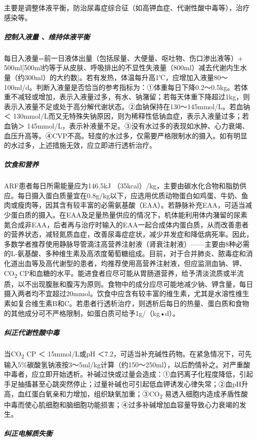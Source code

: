 主要是调整体液平衡，防治尿毒症综合征（如高钾血症、代谢性酸中毒等），治疗感染等。

\subparagraph{控制入液量 、维持体液平衡}

每日入液量=前一日液体出量（包括尿量、大便量、呕吐物、伤口渗出液等）+
500ml{[}500ml约等于从皮肤、呼吸排出的不显性失液量（800ml）减去代谢内生水量（约300ml）的大约数{]}。若有发热，体温每升高1℃，应增加入液量80～100ml/d。判断入液量是否恰当的参考指标为：①体重每日下降0.2～0.5kg。若体重不减轻或增加，表示入液量过多，有水、钠潴留；若每天体重下降超过1kg，则表示入液量不足或处于高分解代谢状态。②血钠保持在130～145mmol/L。若血钠＜
130mmol/L而又无特殊失钠原因，则为稀释性低钠血症，表示入液量过多；若血钠＞
145mmol/L，表示补液量不足。③没有水过多的表现如水肿、心力衰竭、血压升高等。④CVP不高。轻度的水过多，仅需要严格限制水的摄入。如有明显的水过多，上述措施无效，应立即进行透析治疗。

\subparagraph{饮食和营养}

ARF患者每日所需能量应为146.5kJ
（35kcal）/kg，主要由碳水化合物和脂肪供应。每日摄入蛋白质量宜在0.8g/kg以下，应选用优质动物蛋白如鸡蛋、牛奶、鱼肉或瘦肉等，因其含有较丰富的必需氨基酸（EAA）。若静脉补充EAA，可适当减少蛋白质的摄入。在EAA及足量热量供应的情况下，机体能利用体内潴留的尿素氮合成非EAA，后者再与治疗时输入的EAA一起合成体内蛋白质，从而改善患者的营养状态，减轻氮质血症，改善尿毒症症状，减少并发症和降低病死率。因此，多数学者推荐使用静脉导管滴注高营养注射液（肾衰注射液）------主要由8种必需的L-氨基酸、多种维生素及高浓度葡萄糖组成。目前，对于合并肺炎、脓毒症和消化道出血等及高代谢型的患者，均推荐使用高营养注射液，但应监测血钠、钾、CO\textsubscript{2}
CP和血糖的水平。能进食者应尽可能从胃肠道营养，给予清淡流质或半流质，以不出现腹胀和腹泻为原则。食物中的成分应尽可能地减少钠、钾含量，每日摄入两者均不宜超过20mmol。饮食中应含有较丰富的维生素，尤其是水溶性维生素如复合维生素B和C。若患者行透析治疗，则透析后每日的热量、蛋白质和食物的其他成分可不严格限制，如蛋白质可给予1g/（kg•d）。

\subparagraph{纠正代谢性酸中毒}

当CO\textsubscript{2} CP ＜ 15mmol/L或pH
＜7.2，可适当补充碱性药物。在紧急情况下，可先输入5\%碳酸氢钠液按3～5ml/kg计算（约150～250ml），以后酌情补之。对严重酸中毒者，应立即开始透析。补碱过快或过量会造成：①血钙离子化程度降低，引起手足抽搐甚至心跳突然停止；过量补碱也可引起低血钾诱发心律失常；②血pH升高，血红蛋白氧亲和力增加，组织缺氧加重；③CO\textsubscript{2}
易透入细胞内造成矛盾性酸中毒而使心肌细胞和脑细胞功能损害；④过多补碱增加血容量导致心力衰竭的发生。

\subparagraph{纠正电解质失衡}

